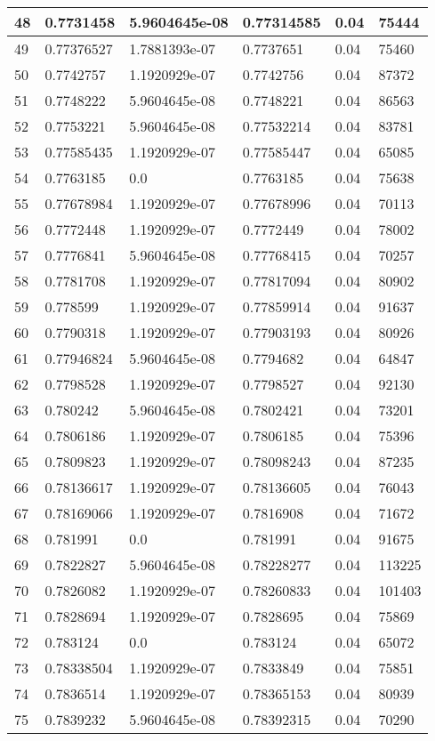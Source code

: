 \begin{longtable}{|l|l|l|l|l|l|}
48 & 0.7731458 & 5.9604645e-08 & 0.77314585 & 0.04 & 75444 \\ \hline 
49 & 0.77376527 & 1.7881393e-07 & 0.7737651 & 0.04 & 75460 \\ \hline 
50 & 0.7742757 & 1.1920929e-07 & 0.7742756 & 0.04 & 87372 \\ \hline 
51 & 0.7748222 & 5.9604645e-08 & 0.7748221 & 0.04 & 86563 \\ \hline 
52 & 0.7753221 & 5.9604645e-08 & 0.77532214 & 0.04 & 83781 \\ \hline 
53 & 0.77585435 & 1.1920929e-07 & 0.77585447 & 0.04 & 65085 \\ \hline 
54 & 0.7763185 & 0.0 & 0.7763185 & 0.04 & 75638 \\ \hline 
55 & 0.77678984 & 1.1920929e-07 & 0.77678996 & 0.04 & 70113 \\ \hline 
56 & 0.7772448 & 1.1920929e-07 & 0.7772449 & 0.04 & 78002 \\ \hline 
57 & 0.7776841 & 5.9604645e-08 & 0.77768415 & 0.04 & 70257 \\ \hline 
58 & 0.7781708 & 1.1920929e-07 & 0.77817094 & 0.04 & 80902 \\ \hline 
59 & 0.778599 & 1.1920929e-07 & 0.77859914 & 0.04 & 91637 \\ \hline 
60 & 0.7790318 & 1.1920929e-07 & 0.77903193 & 0.04 & 80926 \\ \hline 
61 & 0.77946824 & 5.9604645e-08 & 0.7794682 & 0.04 & 64847 \\ \hline 
62 & 0.7798528 & 1.1920929e-07 & 0.7798527 & 0.04 & 92130 \\ \hline 
63 & 0.780242 & 5.9604645e-08 & 0.7802421 & 0.04 & 73201 \\ \hline 
64 & 0.7806186 & 1.1920929e-07 & 0.7806185 & 0.04 & 75396 \\ \hline 
65 & 0.7809823 & 1.1920929e-07 & 0.78098243 & 0.04 & 87235 \\ \hline 
66 & 0.78136617 & 1.1920929e-07 & 0.78136605 & 0.04 & 76043 \\ \hline 
67 & 0.78169066 & 1.1920929e-07 & 0.7816908 & 0.04 & 71672 \\ \hline 
68 & 0.781991 & 0.0 & 0.781991 & 0.04 & 91675 \\ \hline 
69 & 0.7822827 & 5.9604645e-08 & 0.78228277 & 0.04 & 113225 \\ \hline 
70 & 0.7826082 & 1.1920929e-07 & 0.78260833 & 0.04 & 101403 \\ \hline 
71 & 0.7828694 & 1.1920929e-07 & 0.7828695 & 0.04 & 75869 \\ \hline 
72 & 0.783124 & 0.0 & 0.783124 & 0.04 & 65072 \\ \hline 
73 & 0.78338504 & 1.1920929e-07 & 0.7833849 & 0.04 & 75851 \\ \hline 
74 & 0.7836514 & 1.1920929e-07 & 0.78365153 & 0.04 & 80939 \\ \hline 
75 & 0.7839232 & 5.9604645e-08 & 0.78392315 & 0.04 & 70290 \\ \hline 
\end{longtable}